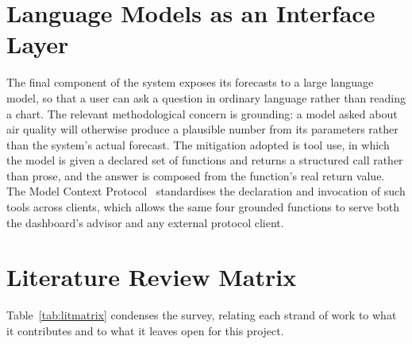 \section{Language Models as an Interface Layer}
The final component of the system exposes its forecasts to a large language
model, so that a user can ask a question in ordinary language rather than reading
a chart. The relevant methodological concern is grounding: a model asked about
air quality will otherwise produce a plausible number from its parameters rather
than the system's actual forecast. The mitigation adopted is tool use, in which
the model is given a declared set of functions and returns a structured call
rather than prose, and the answer is composed from the function's real return
value. The Model Context Protocol~\cite{ref:mcp} standardises the declaration and
invocation of such tools across clients, which allows the same four grounded
functions to serve both the dashboard's advisor and any external protocol client.

\section{Literature Review Matrix}
Table~\ref{tab:litmatrix} condenses the survey, relating each strand of work to
what it contributes and to what it leaves open for this project.

